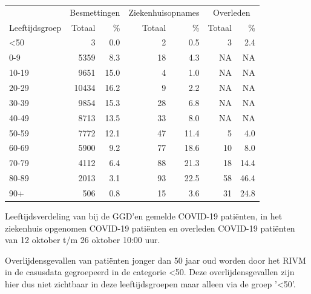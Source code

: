 \documentclass[
  english,
  man,floatsintext]{apa6}
\begin{document}
\begin{table}
\centering\begingroup\fontsize{11}{13}\selectfont

\begin{threeparttable}
\begin{tabular}{lrrrrrr}
\toprule
\multicolumn{1}{c}{ } & \multicolumn{2}{c}{Besmettingen} & \multicolumn{2}{c}{Ziekenhuisopnames} & \multicolumn{2}{c}{Overleden} \\
\cmidrule(l{3pt}r{3pt}){2-3} \cmidrule(l{3pt}r{3pt}){4-5} \cmidrule(l{3pt}r{3pt}){6-7}
Leeftijdsgroep & Totaal & \% & Totaal & \% & Totaal & \%\\
\midrule
<50 & 3 & 0.0 & 2 & 0.5 & 3 & 2.4\\
0-9 & 5359 & 8.3 & 18 & 4.3 & NA & NA\\
10-19 & 9651 & 15.0 & 4 & 1.0 & NA & NA\\
20-29 & 10434 & 16.2 & 9 & 2.2 & NA & NA\\
30-39 & 9854 & 15.3 & 28 & 6.8 & NA & NA\\
40-49 & 8713 & 13.5 & 33 & 8.0 & NA & NA\\
50-59 & 7772 & 12.1 & 47 & 11.4 & 5 & 4.0\\
60-69 & 5900 & 9.2 & 77 & 18.6 & 10 & 8.0\\
70-79 & 4112 & 6.4 & 88 & 21.3 & 18 & 14.4\\
80-89 & 2013 & 3.1 & 93 & 22.5 & 58 & 46.4\\
90+ & 506 & 0.8 & 15 & 3.6 & 31 & 24.8\\
\bottomrule
\end{tabular}
\begin{tablenotes}
\item[1] Leeftijdsverdeling van bij de GGD’en gemelde COVID-19 patiënten, in het ziekenhuis opgenomen COVID-19 patiënten en overleden COVID-19 patiënten van 12 oktober t/m 26 oktober 10:00 uur.
\item[2] Overlijdensgevallen van patiënten jonger dan 50 jaar oud worden door het RIVM in de casusdata gegroepeerd in de categorie <50. Deze overlijdensgevallen zijn hier dus niet zichtbaar in deze leeftijdsgroepen maar alleen via de groep '<50'.
\end{tablenotes}
\end{threeparttable}
\endgroup{}
\end{table}

\newpage
\end{document}
